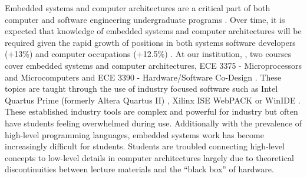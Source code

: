 \begin{comment}
\item Has anyone else done anything similar?
\begin{itemize}
\item Yes. 
\end{itemize}
\item Is your research relevant to research/practice/theory in your field?
\begin{itemize}
\item Education is always required
\item Improvements are required as IoT increases and devices are moving back towards small
microelectronics
\end{itemize}
\item What is already known or understood about this topic?
\begin{itemize}
\item Simulations: \cite{Tappan2009}, \cite{Skrien2001}, \cite{Skillen2011}
\item Curriculum: 
\end{itemize}
\item How might your research add to this understanding, or challenge existing theories and beliefs?
\begin{itemize}
\item Extend on existing solution
\item Propose opportunity to replace multiple configurations, not a single one
\end{itemize}
\end{itemize}
\end{comment}

Embedded systems and computer architectures are a critical part of both computer and software engineering undergraduate programs \cite{cec2016, sec2015, ece-ce-program, Ristov2011, Stolikj2011}. Over time, it is expected that knowledge of embedded systems and computer architectures will be required given the rapid growth of positions in both systems software developers (+13\%) and computer occupations (+12.5\%) \cite{bls2014}. At our institution, \uwo{}, two courses cover embedded systems and computer architectures, ECE 3375 - Microprocessors and Microcomputers and ECE 3390 - Hardware/Software Co-Design \cite{eceOutlines}. These topics are taught through the use of industry focused software such as Intel Quartus Prime (formerly Altera Quartus II) \cite{quartus}, Xilinx ISE WebPACK \cite{xilinxISE} or WinIDE \cite{winide}. These established industry tools are complex and powerful for industry but often have students feeling overwhelmed during use. Additionally with the prevalence of high-level programming languages, embedded systems work has become increasingly difficult for students. Students are troubled connecting high-level concepts to low-level details in computer architectures largely due to theoretical discontinuities between lecture materials and the ``black box'' of hardware. 

